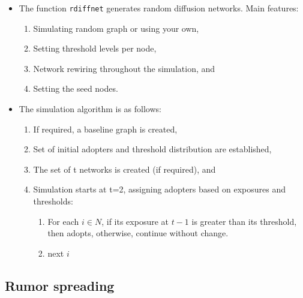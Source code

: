 \documentclass[
]{book}
\begin{document}
\begin{itemize}
\item
  The function \texttt{rdiffnet} generates random diffusion networks. Main features:

  \begin{enumerate}
  \def\labelenumi{\arabic{enumi}.}
  \item
    Simulating random graph or using your own,
  \item
    Setting threshold levels per node,
  \item
    Network rewiring throughout the simulation, and
  \item
    Setting the seed nodes.
  \end{enumerate}
\item
  The simulation algorithm is as follows:

  \begin{enumerate}
  \def\labelenumi{\arabic{enumi}.}
  \item
    If required, a baseline graph is created,
  \item
    Set of initial adopters and threshold distribution are established,
  \item
    The set of t networks is created (if required), and
  \item
    Simulation starts at t=2, assigning adopters based on exposures and thresholds:

    \begin{enumerate}
    \def\labelenumii{\alph{enumii}.}
    \item
      For each \(i \in N\), if its exposure at \(t-1\) is greater than its threshold, then
      adopts, otherwise, continue without change.
    \item
      next \(i\)
    \end{enumerate}
  \end{enumerate}
\end{itemize}

\hypertarget{rumor-spreading}{%
\subsection{Rumor spreading}\label{rumor-spreading}}
\end{document}
